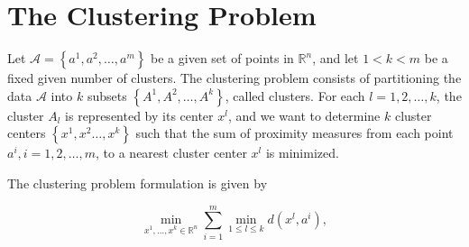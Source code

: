 \documentclass[11pt]{article}
\numberwithin{equation}{section}
\begin{document}
%
%
%
%
%
%
%
%
%
%
%
%
%
%
%
%
%
%
%
%
%

\newpage

\section{The Clustering Problem}

Let $\mathcal{A}= \left\lbrace a^1, a^2, \ldots ,a^m \right\rbrace$ be a given set of points in $\mathbb{R}^n$, and let $1 < k < m$ be a fixed given number of clusters. The clustering problem consists of partitioning the data $\mathcal{A}$ into $k$ subsets $\left\lbrace A^1, A^2, \ldots ,A^k \right\rbrace$, called clusters. For each $l=1, 2, \ldots ,k$, the cluster $A_l$ is represented by its center $x^l$, and we want to determine $k$ cluster centers $\left\lbrace x^1, x^2 \ldots ,x^k \right\rbrace$ such that the sum of proximity measures from each point $a^i, i=1, 2, \ldots ,m$, to a nearest cluster center $x^l$ is minimized.

The clustering problem formulation is given by

\begin{equation}
	\min\limits_{x^1, \ldots ,x^k \in \mathbb{R}^n} \sum\limits_{i=1}^{m} \min\limits_{1 \le l \le k} d(x^l,a^i) , \label{StateEq1}
\end{equation}
\end{document}
